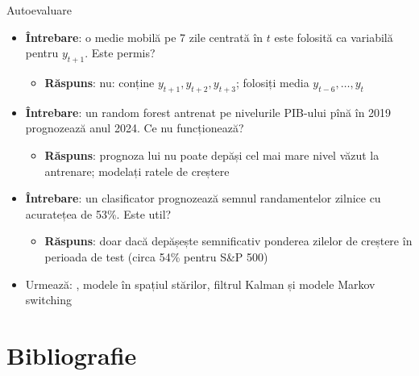\begin{frame}{Autoevaluare}
\itemsize{\small}
\begin{itemize}
    \item \textbf{Întrebare}: o medie mobilă pe 7 zile centrată în $t$ este folosită ca variabilă pentru $y_{t+1}$. Este permis?
    \begin{itemize}
        \item \textbf{Răspuns}: nu: conține $y_{t+1}, y_{t+2}, y_{t+3}$; folosiți media $y_{t-6}, \dots, y_t$
    \end{itemize}
    \item \textbf{Întrebare}: un random forest antrenat pe nivelurile PIB-ului pînă în 2019 prognozează anul 2024. Ce nu funcționează?
    \begin{itemize}
        \item \textbf{Răspuns}: prognoza lui nu poate depăși cel mai mare nivel văzut la antrenare; modelați ratele de creștere
    \end{itemize}
    \item \textbf{Întrebare}: un clasificator prognozează semnul randamentelor zilnice cu acuratețea de 53\%. Este util?
    \begin{itemize}
        \item \textbf{Răspuns}: doar dacă depășește semnificativ ponderea zilelor de creștere în perioada de test (circa 54\% pentru S\&P 500)
    \end{itemize}
    \item Urmează: , modele în spațiul stărilor, filtrul Kalman și modele Markov switching
\end{itemize}
\end{frame}


\section{Bibliografie}

